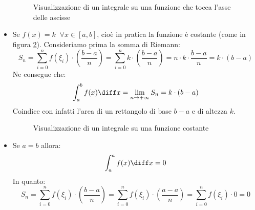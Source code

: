 \begin{itemize}
\begin{figure}[h]
\begin{center}
			\end{center}
			\caption{Visualizzazione di un integrale su una funzione che tocca 
            l'asse delle ascisse}
			\label{fig_sottografico_pos_zero}
		\end{figure}

	\item Se $f(x) = k \;\; \forall x \in [a,b]$, cioè in pratica la funzione è 
        costante (come in figura \ref{fig_sottografico_rettangolo}). 
        Consideriamo prima la somma di Riemann: 
		\begin{equation*}
			S_n = \sum \limits_{i = 0}^n f(\xi_i) \cdot \left(\dfrac{b-a}{n}
            \right) = \sum \limits_{i = 0}^n k \cdot \left(\dfrac{b-a}{n}
            \right) = n \cdot k \cdot \dfrac{b-a}{n} = k \cdot (b-a)
		\end{equation*}
		Ne consegue che:
		\begin{equation*}
			\int_a^b f(x) \diff x = \lim_{n \to +\infty} S_n = k \cdot (b-a)
		\end{equation*}
		Coindice con infatti l'area di un rettangolo di base $b-a$ e di altezza 
        $k$.


		\begin{figure}[h]
			\begin{center}


			\end{center}
			\caption{Visualizzazione di un integrale su una funzione costante}
			\label{fig_sottografico_rettangolo}
		\end{figure}
	
	\item Se $a = b$ allora:
		\begin{equation*}
			\int_a^a f(x) \diff x = 0
		\end{equation*}
		In quanto:
		\begin{equation*}
			S_n = \sum \limits_{i = 0}^n f(\xi_i) \cdot \left(\dfrac{b-a}{n}
            \right) = \sum \limits_{i = 0}^n f(\xi_i) \cdot \left(
            \dfrac{a-a}{n}\right) = \sum \limits_{i = 0}^n f(\xi_i) \cdot 0 = 0
		\end{equation*}
\end{itemize}

